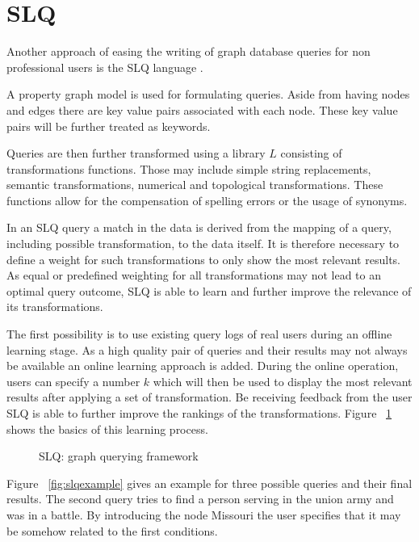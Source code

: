 \documentclass{sig-alternate}
\begin{document}
\section{SLQ}
Another approach of easing the writing of graph database queries for non
professional users is the SLQ language \cite{yang2014schemaless} \cite{yang2014slq}. 

A property graph model is used for formulating queries. Aside
from having nodes and edges there are key value pairs associated with
each node. These key value pairs will be further treated as keywords.

Queries are then further transformed using a library $L$ consisting of transformations
functions. Those may include simple string replacements, semantic transformations,
numerical and topological transformations.
These functions allow for the compensation of spelling errors or the
usage of synonyms.

In an SLQ query a match in the data is derived from the mapping
of a query, including possible transformation, to the data itself. It is therefore necessary 
to define a weight for such transformations to only show the most relevant results.
As equal or predefined weighting for all transformations may not lead to an optimal 
query outcome, SLQ is able to learn and further improve the relevance of its transformations.

The first possibility is to use existing query logs of real users during an offline learning stage.
As a high quality pair of queries and their results may not always be available an online learning approach
is added. During the online operation, users can specify a number $k$ which will then be used
to display the most relevant results after applying a set of transformation. Be receiving 
feedback from the user SLQ is able to further improve the rankings of the transformations.
Figure ~\ref{fig:slqlearning} shows the basics of this learning process.

\begin{figure}[H]
\centering
{}
\caption{SLQ: graph querying framework \cite{yang2014schemaless}}
\label{fig:slqlearning}
\end{figure}

Figure ~\ref{fig:slqexample} gives an example for three possible queries and their final results.
The second query tries to find a person serving in the union army and was in a battle. By introducing 
the node Missouri the user specifies that it may be somehow related to the first conditions.
\end{document}
